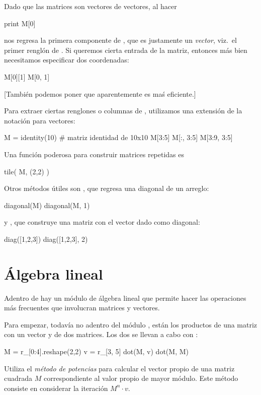 Dado que las matrices son vectores de vectores, al hacer
\begin{python}
print M[0]
\end{python}
nos regresa la primera componente de , que es justamente un \emph{vector}, viz.~el primer renglón de .
Si queremos cierta entrada de la matriz, entonces más bien necesitamos especificar dos coordenadas:
\begin{python}
M[0][1]
M[0, 1]	
\end{python}
[También podemos poner  que aparentemente es maś eficiente.]

Para extraer ciertas renglones o columnas de , utilizamos una extensión de la notación para vectores:
\begin{python}
M = identity(10)	 	# matriz identidad de 10x10
M[3:5]
M[:, 3:5]
M[3:9, 3:5]
\end{python}


Una función poderosa para construir matrices repetidas es 
\begin{python}
tile( M, (2,2) )
\end{python}

Otros métodos útiles son , que regresa una diagonal de un arreglo:
\begin{python}
diagonal(M)
diagonal(M, 1)
\end{python}
y , que construye una matriz con el vector dado como diagonal:
\begin{python}
diag([1,2,3])
diag([1,2,3], 2)
\end{python}



\section{Álgebra lineal}
Adentro de  hay un módulo de álgebra lineal que permite hacer las operaciones más frecuentes que involucran matrices y vectores.

Para empezar, todavía no adentro del módulo , están  los productos de una matriz  con un vector  y de dos matrices. Los dos se llevan a cabo con :
\begin{python}
M = r_[0:4].reshape(2,2)
v = r_[3, 5]
dot(M, v)
dot(M, M)
\end{python}

\ej Utiliza el \emph{método de potencias} para calcular el vector propio de una matriz cuadrada $M$ correspondiente al valor propio de mayor módulo. Este método consiste en considerar la iteración $M^n \cdot v$.

